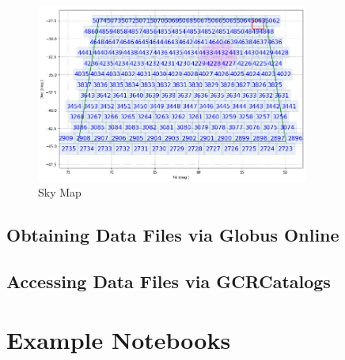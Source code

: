 \documentclass[11pt]{report}
\begin{document}
\begin{figure}[tbh!]
    \centering
    \includegraphics[width=0.8\textwidth]{figs/skymap.png}
    \caption{Sky Map}
    \label{fig:skymap}
\end{figure}



\subsection{Obtaining Data Files via Globus Online}
\label{sec:download}

\subsection{Accessing Data Files via GCRCatalogs}
\label{sec:gcr}



\section{Example Notebooks}
\label{sec:notebooks}



\end{document}
